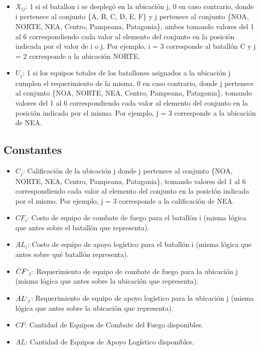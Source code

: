 \documentclass[12pt]{article}
\begin{document}
\begin{itemize}
    \item $X_{ij}$: 1 si el batallon i se desplegó en la ubicación j, 0 en caso contrario, donde i pertenece al conjunto \{A, B, C, D, E, F\} y j pertenece al conjunto \{NOA, NORTE, NEA, Centro, Pampeana, Patagonia\}, ambos tomando valores del 1 al 6 correspondiendo cada valor al elemento del conjunto en la posición indicada por el valor de i o j. Por ejemplo, i = 3 corresponde al batallón C y j = 2 corresponde a la ubicación NORTE. 
    \item $U_{j}$: 1 si los equipos totales de los batallones asignados a la ubicación j cumplen el requerimiento de la misma, 0 en caso contrario, donde j pertenece al conjunto \{NOA, NORTE, NEA, Centro, Pampeana, Patagonia\}, tomando valores del 1 al 6 correspondiendo cada valor al elemento del conjunto en la posición indicada por el mismo. Por ejemplo, j = 3 corresponde a la ubicación de NEA. 
\end{itemize}

\subsection{Constantes}

\begin{itemize}
    \item \textbf{$C_{j}$}: Calificación de la ubicación j donde j pertenece al conjunto \{NOA, NORTE, NEA, Centro, Pampeana, Patagonia\}, tomando valores del 1 al 6 correspondiendo cada valor al elemento del conjunto en la posición indicada por el mismo. Por ejemplo, j = 3 corresponde a la calificación de NEA.
    \item \textbf{$CF_{i}$}: Costo de equipo de combate de fuego para el batallón i (misma lógica que antes sobre el batallón que representa).
    \item \textbf{$AL_{i}$}: Costo de equipo de apoyo logístico para el batallón i (misma lógica que antes sobre qué batallón representa).
    \item \textbf{$CF`_{j}$}: Requerimiento de equipo de combate de fuego para la ubicación j (misma lógica que antes sobre la ubicación que representa).
    \item \textbf{$AL`_{j}$}: Requerimiento de equipo de apoyo logístico para la ubicación j (misma lógica que antes sobre la ubicación que representa).
    \item \textbf{$CF$}: Cantidad de Equipos de Combate del Fuego disponibles.
    \item \textbf{$AL$}: Cantidad de Equipos de Apoyo Logístico disponibles.
\end{itemize}
\end{document}
